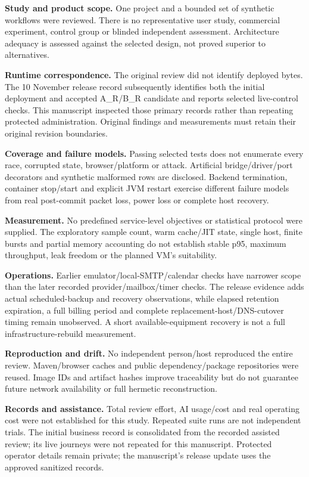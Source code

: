 \documentclass[11pt,a4paper]{article}
\begin{document}
\textbf{Study and product scope.} One project and a bounded set of synthetic workflows were reviewed. There is no representative user study, commercial experiment, control group or blinded independent assessment. Architecture adequacy is assessed against the selected design, not proved superior to alternatives.

\textbf{Runtime correspondence.} The original review did not identify deployed bytes. The 10 November release record subsequently identifies both the initial deployment and accepted A\_R/\allowbreak{}B\_R candidate and reports selected live-control checks. This manuscript inspected those primary records rather than repeating protected administration. Original findings and measurements must retain their original revision boundaries.

\textbf{Coverage and failure models.} Passing selected tests does not enumerate every race, corrupted state, browser/\allowbreak{}platform or attack. Artificial bridge/\allowbreak{}driver/\allowbreak{}port decorators and synthetic malformed rows are disclosed. Backend termination, container stop/\allowbreak{}start and explicit JVM restart exercise different failure models from real post-commit packet loss, power loss or complete host recovery.

\textbf{Measurement.} No predefined service-level objectives or statistical protocol were supplied. The exploratory sample count, warm cache/\allowbreak{}JIT state, single host, finite bursts and partial memory accounting do not establish stable p95, maximum throughput, leak freedom or the planned VM's suitability.

\textbf{Operations.} Earlier emulator/\allowbreak{}local-SMTP/\allowbreak{}calendar checks have narrower scope than the later recorded provider/\allowbreak{}mailbox/\allowbreak{}timer checks. The release evidence adds actual scheduled-backup and recovery observations, while elapsed retention expiration, a full billing period and complete replacement-host/\allowbreak{}DNS-cutover timing remain unobserved. A short available-equipment recovery is not a full infrastructure-rebuild measurement.

\textbf{Reproduction and drift.} No independent person/\allowbreak{}host reproduced the entire review. Maven/\allowbreak{}browser caches and public dependency/\allowbreak{}package repositories were reused. Image IDs and artifact hashes improve traceability but do not guarantee future network availability or full hermetic reconstruction.

\textbf{Records and assistance.} Total review effort, AI usage/\allowbreak{}cost and real operating cost were not established for this study. Repeated suite runs are not independent trials. The initial business record is consolidated from the recorded assisted review; its live journeys were not repeated for this manuscript. Protected operator details remain private; the manuscript's release update uses the approved sanitized records.
\end{document}
